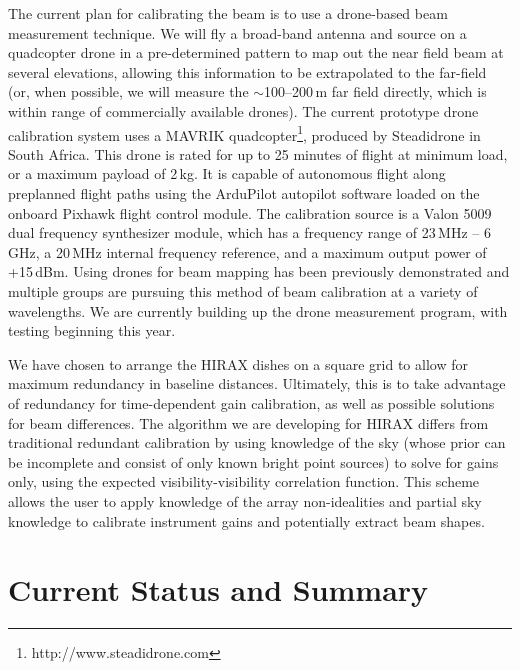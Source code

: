 \documentclass[]{spie}  %
\begin{document}
The current plan for calibrating the beam is to use a drone-based beam measurement technique. We will fly a broad-band antenna and source on a quadcopter drone in a pre-determined pattern to map out the near field beam at several elevations, allowing this information to be extrapolated to the far-field (or, when possible, we will measure the $\sim$100--200\,m far field directly, which is within range of commercially available drones). The current prototype drone calibration system uses a MAVRIK quadcopter\footnote{http:\//\//www.steadidrone.com}, produced by Steadidrone in South Africa. This drone is rated for up to 25 minutes of flight at minimum load, or a maximum payload of 2\,kg. It is capable of autonomous flight along preplanned flight paths using the ArduPilot autopilot software loaded on the onboard Pixhawk flight control module. The calibration source is a Valon 5009 dual frequency synthesizer module, which has a frequency range of 23\,MHz -- 6\,GHz, a 20\,MHz internal frequency reference, and a maximum output power of +15\,dBm. Using drones for beam mapping has been previously demonstrated \cite{2015PASP..127.1131C} and multiple groups are pursuing this method of beam calibration at a variety of wavelengths. We are currently building up the drone measurement program, with testing beginning this year.\newline

We have chosen to arrange the HIRAX dishes on a square grid to allow for maximum redundancy in baseline distances. Ultimately, this is to take advantage of redundancy for time-dependent gain calibration, as well as possible solutions for beam differences. The algorithm we are developing for HIRAX \cite{sievers} differs from traditional redundant calibration \cite{2010MNRAS.408.1029L} by using knowledge of the sky (whose prior can be incomplete and consist of only known bright point sources) to solve for gains only, using the expected visibility-visibility correlation function. This scheme allows the user to apply knowledge of the array non-idealities and partial sky knowledge to calibrate instrument gains and potentially extract beam shapes. \newline

\section{Current Status and Summary}
\end{document}
